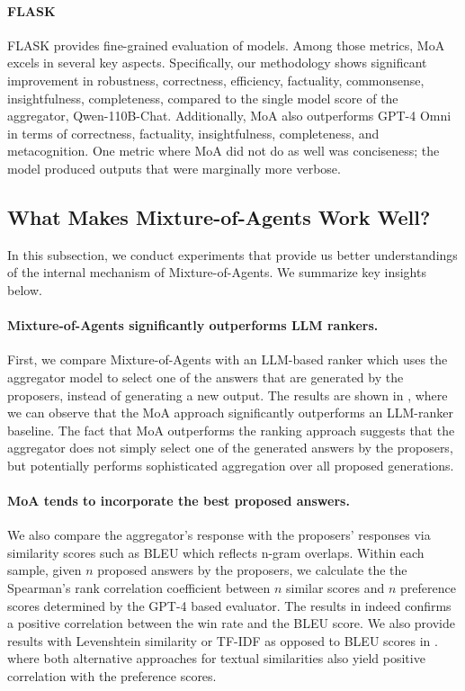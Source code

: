 \documentclass{article}
\begin{document}
\paragraph{FLASK} 
FLASK provides fine-grained evaluation of models. 
Among those metrics, MoA excels in several key aspects. 
Specifically, our methodology shows significant improvement in 
robustness, correctness, efficiency, factuality, commonsense, 
insightfulness, completeness, 
compared to the single model score of the aggregator, Qwen-110B-Chat.
Additionally, MoA also outperforms GPT-4 Omni in terms of correctness, factuality, insightfulness, completeness, and metacognition. 
One metric where MoA did not do as well was conciseness; 
the model produced outputs that were marginally more verbose. 



\subsection{What Makes Mixture-of-Agents Work Well?}
\label{section:role} \label{section:understand_moa}


In this subsection, we conduct experiments that provide us better understandings of the internal mechanism of Mixture-of-Agents. We summarize  key insights below.



\paragraph{Mixture-of-Agents significantly outperforms LLM rankers.}
 First, we compare Mixture-of-Agents with an LLM-based ranker which uses the aggregator model to select one of the answers that are generated by the proposers, instead of generating a new output. The results are shown in , where we can observe that the MoA approach significantly outperforms an LLM-ranker baseline. The fact that MoA outperforms the ranking approach suggests that the aggregator does not simply select one of the generated answers by the proposers, but potentially performs sophisticated aggregation over all proposed generations.

\paragraph{MoA tends to incorporate the best proposed answers.}
 We also compare the aggregator's response with the proposers' responses via similarity scores such as BLEU \citep{bleu} which reflects n-gram overlaps. Within each sample, given $n$ proposed answers by the proposers, we calculate the the Spearman's rank correlation coefficient between $n$ similar scores and $n$ preference scores determined by the GPT-4 based evaluator.
 The results in  indeed confirms a positive correlation between the win rate and the BLEU score. 
 We also provide results with Levenshtein similarity \citep{RapidFuzzPythonLevenshtein} or TF-IDF as opposed to BLEU scores in .
 where both alternative approaches for textual similarities also yield positive correlation with the preference scores.
\end{document}
